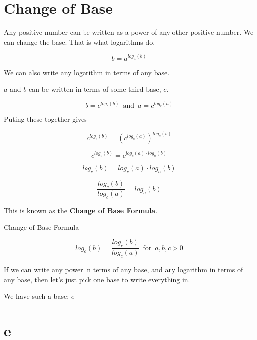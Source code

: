 \documentclass{ximera}
\begin{document}
\section{Change of Base}


Any positive number can be written as a power of any other positive number.  We can change the base. That is what logarithms do.


\[    b = a^{log_a(b)}  \]


We can also write any logarithm in terms of any base.




$a$ and $b$ can be written in terms of some third base, $c$.


\[    b = c^{log_c(b)} \,   \text{ and } \,      a = c^{log_c(a)}      \]



Puting these together gives 



\[   c^{log_c(b)} = \left(c^{log_c(a)}\right)^{log_a(b)}  \]



\[   c^{log_c(b)} = c^{log_c(a) \cdot log_a(b)}  \]



\[   log_c(b) = log_c(a) \cdot log_a(b)  \]


\[   \frac{log_c(b)}{log_c(a)} =  log_a(b)  \]


This is known as the \textbf{Change of Base Formula}.








\begin{fact}  Change of Base Formula

\[   log_a(b)  =  \frac{log_c(b)}{log_c(a)}        \, \text{ for } \, a, b, c  > 0        \]


\end{fact}









If we can write any power in terms of any base, and any logarithm in terms of any base, then let's just pick one base to write everything in.


We have such a base: $e$





\section{e}
\end{document}
